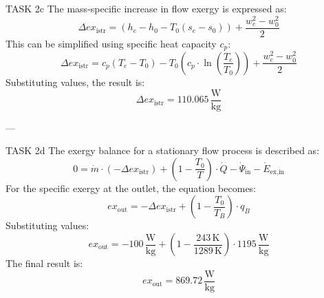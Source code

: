 TASK 2c  
The mass-specific increase in flow exergy is expressed as:  
\[
\Delta ex_{\text{istr}} = (h_e - h_0 - T_0 (s_e - s_0)) + \frac{w_e^2 - w_0^2}{2}
\]  
This can be simplified using specific heat capacity \( c_p \):  
\[
\Delta ex_{\text{istr}} = c_p (T_e - T_0) - T_0 \left( c_p \cdot \ln \left( \frac{T_e}{T_0} \right) \right) + \frac{w_e^2 - w_0^2}{2}
\]  
Substituting values, the result is:  
\[
\Delta ex_{\text{istr}} = 110.065 \, \frac{\text{W}}{\text{kg}}
\]  

---

TASK 2d  
The exergy balance for a stationary flow process is described as:  
\[
0 = \dot{m} \cdot (-\Delta ex_{\text{istr}}) + \left( 1 - \frac{T_0}{T} \right) \cdot \dot{Q} - \dot{\Psi}_{\text{in}} - \dot{E}_{\text{ex,in}}
\]  
For the specific exergy at the outlet, the equation becomes:  
\[
ex_{\text{out}} = -\Delta ex_{\text{istr}} + \left( 1 - \frac{T_0}{T_B} \right) \cdot q_B
\]  
Substituting values:  
\[
ex_{\text{out}} = -100 \, \frac{\text{W}}{\text{kg}} + \left( 1 - \frac{243 \, \text{K}}{1289 \, \text{K}} \right) \cdot 1195 \, \frac{\text{W}}{\text{kg}}
\]  
The final result is:  
\[
ex_{\text{out}} = 869.72 \, \frac{\text{W}}{\text{kg}}
\]  